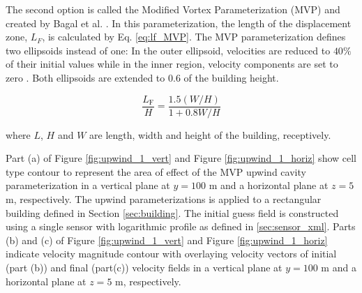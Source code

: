 The second option is called the Modified
Vortex Parameterization (MVP) and created by Bagal et al. \cite{bagal2004improved}. In this parameterization, the length of the displacement zone, $L_F$, is calculated by Eq. \ref{eq:lf_MVP}. The MVP parameterization defines two ellipsoids instead of one: In the outer ellipsoid,  velocities are reduced to $40\%$ of their initial values while in the inner region, velocity components are set to zero \cite{nelson20085}. Both ellipsoids are extended to $0.6$ of the building height.

\begin{equation}
\frac{L_{\mathrm{F}}}{H}=\frac{1.5(W / H)}{1+0.8 W / H}
\label{eq:lf_MVP}
\end{equation}

where $L$, $H$ and $W$ are length, width and height of the building, receptively.

Part (a) of Figure \ref{fig:upwind_1_vert} and Figure \ref{fig:upwind_1_horiz} show cell type contour to represent the area of effect of the MVP upwind cavity parameterization in a vertical plane at $y=100$ m and a horizontal plane at $z=5$ m, respectively. The upwind parameterizations is applied to a rectangular building defined in Section \ref{sec:building}. The initial guess field is constructed using a single sensor with logarithmic profile as defined in \ref{sec:sensor_xml}. Parts (b) and (c) of Figure \ref{fig:upwind_1_vert} and Figure \ref{fig:upwind_1_horiz} indicate velocity magnitude contour with overlaying velocity vectors of initial (part (b)) and final (part(c)) velocity fields in a vertical plane at $y=100$ m and a horizontal plane at $z=5$ m, respectively.

